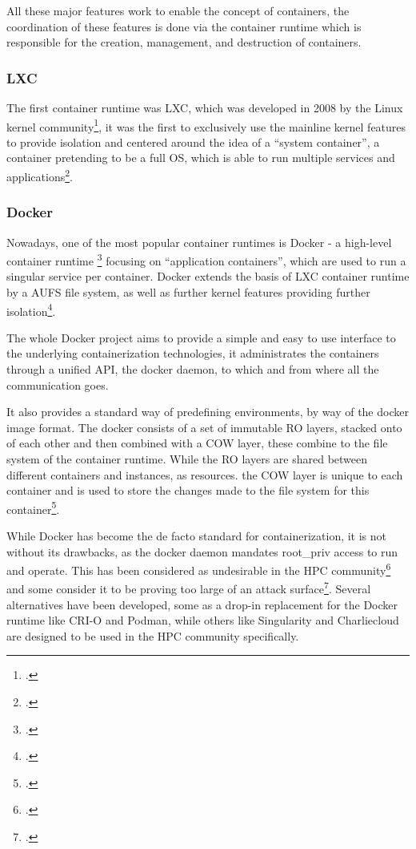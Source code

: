 All these major features work to enable the concept of containers,
the coordination of these features is done via the container runtime
which is responsible for the creation, management, and destruction of containers.

\subsubsection{LXC}

The first container runtime was \ac{LXC}, which was developed in 2008 by the Linux kernel community\footcite{jordanwebbLXCLXDDifferent},
it was the first to exclusively use the mainline kernel features to provide isolation and centered around the idea of a “system container”,
a container pretending to be a full \ac{OS}, which is able to run multiple services and applications\footcite{kumarans.PracticalLXCLXD2017}.

\subsubsection{Docker}
\label{sec:docker}
Nowadays, one of the most popular container runtimes is Docker - a high-level container runtime \footcite{vailsheryLeadingContainerizationTechnologies}
focusing on “application containers”, which are used to run a singular service per container.
Docker extends the basis of  \ac{LXC} container runtime by a \ac{AUFS} file system,
as well as further kernel features providing further isolation\footcite{debabContainersRuntimesWar2021}.

The whole Docker project aims to provide a simple and easy to use interface to the underlying containerization technologies,
it administrates the containers through a unified \ac{API}, the docker \gls{daemon}, to which and from where all the communication goes.

It also provides a standard way of predefining environments, by way of the docker image format.
The docker consists of a set of immutable \ac{RO} layers, stacked onto of each other and then combined with a \ac{COW} layer,
these combine to the file system of the container runtime.
While the \ac{RO} layers are shared between different containers and instances, as resources.
the \ac{COW} layer is unique to each container and is used to store the changes made to the file system for this container\footcite{morabitoHypervisorsVsLightweight2015}.

While Docker has become the de facto standard for containerization, it is not without its drawbacks,
as the docker daemon mandates \gls{root_priv} access to run and operate.
This has been considered as undesirable in the \ac{HPC} community\footcite{mujkanovicSurveyAdaptiveContainerization2023} and some consider it to be proving too large of an attack surface\footcite{priedhorskyCharliecloudUnprivilegedContainers2017}.
Several alternatives have been developed, some as a drop-in replacement for the Docker runtime
like \ac{CRI-O} and Podman, while others like Singularity and Charliecloud are designed to be used in the \ac{HPC} community specifically.


